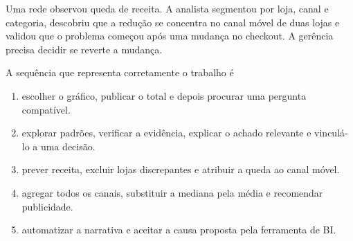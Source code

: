 \TextoBase Uma rede observou queda de receita. A analista segmentou por loja, canal e categoria, descobriu que a redução se concentra no canal móvel de duas lojas e validou que o problema começou após uma mudança no checkout. A gerência precisa decidir se reverte a mudança.
\begin{center}
\end{center}
\FonteDidatica
\Comando A sequência que representa corretamente o trabalho é
\begin{enumerate}[label=\Alph*)]
\item escolher o gráfico, publicar o total e depois procurar uma pergunta compatível.
\item explorar padrões, verificar a evidência, explicar o achado relevante e vinculá-lo a uma decisão.
\item prever receita, excluir lojas discrepantes e atribuir a queda ao canal móvel.
\item agregar todos os canais, substituir a mediana pela média e recomendar publicidade.
\item automatizar a narrativa e aceitar a causa proposta pela ferramenta de BI.
\end{enumerate}

